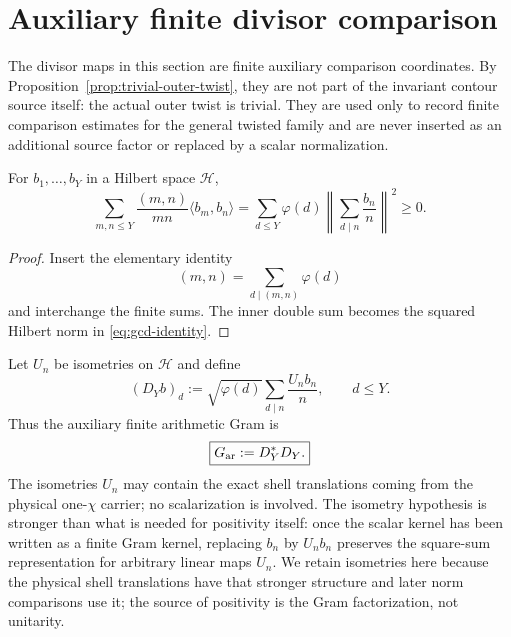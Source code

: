 \section{Auxiliary finite divisor comparison}
\label{sec:divisor-gram}

The divisor maps in this section are finite auxiliary comparison coordinates. By
Proposition~\ref{prop:trivial-outer-twist}, they are not part of the invariant
contour source itself: the actual outer twist is trivial. They are used only to
record finite comparison estimates for the general twisted family and are never
inserted as an additional source factor or replaced by a scalar normalization.

\begin{lemma}
\label{lem:gcd-identity}
For $b_1,\dots,b_Y$ in a Hilbert space $\mathcal H$,
\begin{equation}
\boxed{
\sum_{m,n\le Y}\frac{(m,n)}{mn}\langle b_m,b_n\rangle
=
\sum_{d\le Y}\varphi(d)
\left\|\sum_{d\mid n}\frac{b_n}{n}\right\|^2
\ge0.
}
\label{eq:gcd-identity}
\end{equation}
\end{lemma}

\begin{proof}
Insert the elementary identity
\[
(m,n)=\sum_{d\mid(m,n)}\varphi(d)
\]
and interchange the finite sums. The inner double sum becomes the squared
Hilbert norm in \eqref{eq:gcd-identity}.
\end{proof}

Let $U_n$ be isometries on $\mathcal H$ and define
\begin{equation}
(D_Yb)_d:=\sqrt{\varphi(d)}
\sum_{d\mid n}\frac{U_nb_n}{n},
\qquad d\le Y.
\label{eq:divisor-map}
\end{equation}
Thus the auxiliary finite arithmetic Gram is
\begin{equation}
\boxed{G_{\rm ar}:=D_Y^*D_Y.}
\label{eq:arith-gram}
\end{equation}
The isometries $U_n$ may contain the exact shell translations coming from the
physical one-$\chi$ carrier; no scalarization is involved.  The isometry
hypothesis is stronger than what is needed for positivity itself: once the
scalar kernel has been written as a finite Gram kernel, replacing $b_n$ by
$U_nb_n$ preserves the square-sum representation for arbitrary linear maps
$U_n$.  We retain isometries here because the physical shell translations have
that stronger structure and later norm comparisons use it; the source of
positivity is the Gram factorization, not unitarity.

